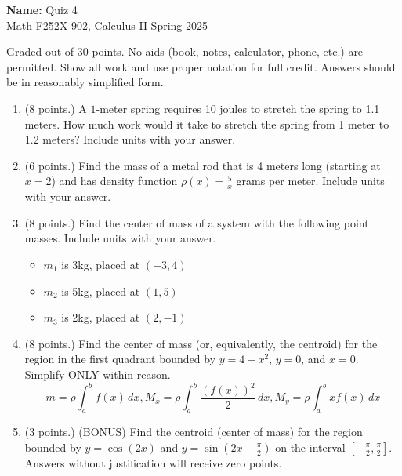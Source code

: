 \documentclass[12pt]{article}
\newcommand{\ds}{\displaystyle}
\newcommand{\points}[1]{(#1 points.)}		%
\begin{document}
\pagestyle{plain}

\noindent \textbf{Name:} \underline{\hspace{15em}}		\hfill	Quiz 4 \\
           Math F252X-902, Calculus II  			\hfill	Spring 2025 	

                \vspace{1cm}
                
Graded out of 30 points. No aids (book, notes,
calculator, phone, etc.) are permitted. Show all work and use proper
notation for full credit. Answers should be in reasonably simplified
form.

\begin{enumerate}
\item \points{8} A $1$-meter spring requires 10 joules to stretch the spring to
  1.1 meters. How much work would it take to stretch the spring from 1
  meter to 1.2 meters? Include units with your answer.
  \vfill
  \vfill

\item\points{6} Find the mass of a metal rod that is 4 meters long (starting at
  $x=2$) and has density function $\ds \rho(x)=\frac{5}{x}$ grams per
  meter. Include units with your answer.
  \vfill

  \newpage

\item \points{8} Find the center of mass of a system with the
  following point masses. Include units with your answer.
  \begin{itemize}
  \item $m_1$ is 3kg, placed at $(-3,4)$
  \item $m_2$ is 5kg, placed at $(1,5)$
  \item $m_3$ is 2kg, placed at $(2,-1)$
  \end{itemize}
  \vfill


\item \points{8} Find the center of mass (or, equivalently, the centroid) for
  the region in the first quadrant bounded by $y=4-x^2$, $y=0$, and
  $x=0$. Simplify ONLY within reason.
  $$
  m=\rho \int_a^b f(x) \, dx, M_x = \rho \int_a^b \frac{(f(x))^2}{2} \, dx , M_y = \rho \int_a^b xf(x) \, dx
  $$
  \vfill
  \vfill

  \newpage
  
\item \points{3} (BONUS) Find the centroid (center of mass)
  for the region bounded by $y=\cos(2x)$ and
  $\ds y=\sin\left(2x-\frac{\pi}{2}\right)$ on the interval $\ds \left[-\frac{\pi}{2},
  \frac{\pi}{2}\right]$. Answers without justification will receive zero points.
  \vfill

\end{enumerate}
\end{document}
